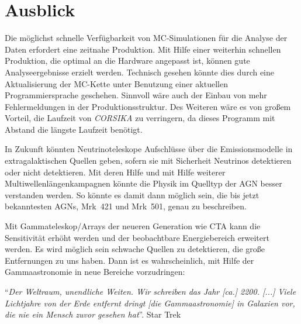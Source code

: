\section*{Ausblick}
Die möglichst schnelle Verfügbarkeit von MC-Simulationen für die Analyse der Daten erfordert eine zeitnahe Produktion.
Mit Hilfe einer weiterhin schnellen Produktion, die optimal an die Hardware angepasst ist, können gute Analyseergebnisse erzielt werden.
Technisch gesehen könnte dies durch eine Aktualisierung der MC-Kette unter Benutzung einer aktuellen Programmiersprache geschehen.
Sinnvoll wäre auch der Einbau von mehr Fehlermeldungen in der Produktionsstruktur.
Des Weiteren wäre es von großem Vorteil, die Laufzeit von \textit{CORSIKA} zu verringern, da dieses Programm mit Abstand die längste Laufzeit benötigt.

In Zukunft könnten Neutrinoteleskope Aufschlüsse über die Emissionsmodelle in extragalaktischen Quellen geben, sofern sie mit Sicherheit Neutrinos detektieren oder nicht detektieren.
Mit deren Hilfe und mit Hilfe weiterer Multiwellenlängenkampagnen könnte die Physik im Quelltyp der AGN besser verstanden werden.
So könnte es damit dann möglich sein, die bis jetzt bekanntesten AGNs, Mrk~421 und Mrk~501, genau zu beschreiben.

Mit Gammateleskop\-/Arrays der neueren Generation wie CTA kann die Sensitivität erhöht werden und der beobachtbare Energiebereich erweitert werden.
Es wird möglich sein schwache Quellen zu detektieren, die große Entfernungen zu uns haben.
Dann ist es wahrscheinlich, mit Hilfe der Gammaastronomie in neue Bereiche vorzudringen: %

\enquote{\textit{Der Weltraum, unendliche Weiten. Wir schreiben das Jahr [ca.] 2200. [...] Viele Lichtjahre von der Erde entfernt dringt [die Gammaastronomie] in Galaxien vor, die nie ein Mensch zuvor gesehen hat}}. Star Trek